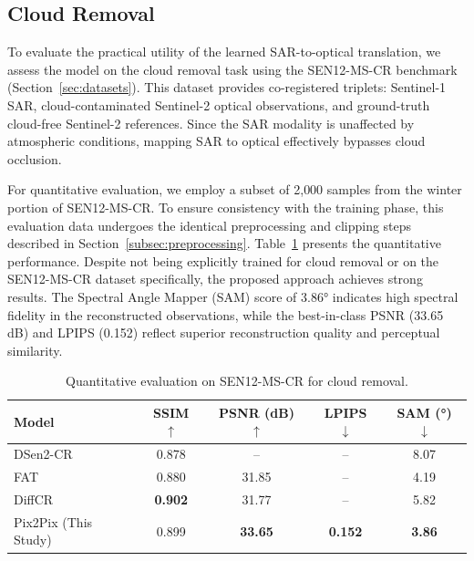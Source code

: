 \documentclass[remotesensing,article,submit,pdftex,moreauthors]{Definitions/mdpi}
\begin{document}
\subsection{Cloud Removal}
\label{sec:cloud_removal}
To evaluate the practical utility of the learned SAR-to-optical translation, we assess the model on the cloud removal task using the SEN12-MS-CR benchmark (Section~\ref{sec:datasets}). This dataset provides co-registered triplets: Sentinel-1 SAR, cloud-contaminated Sentinel-2 optical observations, and ground-truth cloud-free Sentinel-2 references. Since the SAR modality is unaffected by atmospheric conditions, mapping SAR to optical effectively bypasses cloud occlusion.

For quantitative evaluation, we employ a subset of 2{,}000 samples from the winter portion of SEN12-MS-CR. To ensure consistency with the training phase, this evaluation data undergoes the identical preprocessing and clipping steps described in Section~\ref{subsec:preprocessing}. Table~\ref{tab:quantitative_result_cr} presents the quantitative performance. Despite not being explicitly trained for cloud removal or on the SEN12-MS-CR dataset specifically, the proposed approach achieves strong results. The Spectral Angle Mapper (SAM) score of 3.86° indicates high spectral fidelity in the reconstructed observations, while the best-in-class PSNR (33.65 dB) and LPIPS (0.152) reflect superior reconstruction quality and perceptual similarity.

\begin{table}[!htbp]
    \centering
    \caption[Quantitative results on cloud removal against SOTA models]{Quantitative evaluation on SEN12-MS-CR for cloud removal.}
    \begin{tabular}{lcccc}
        \toprule
        \textbf{Model}                & \textbf{SSIM $\uparrow$} & \textbf{PSNR (dB) $\uparrow$} & \textbf{LPIPS $\downarrow$} & \textbf{SAM (°) $\downarrow$} \\
        \midrule
        DSen2-CR~\cite{CR_SEN2_dRNN}  & 0.878                    & --                            & --                          & 8.07                          \\
        FAT~\cite{c_guided_fus_s2ot}  & 0.880                    & 31.85                         & --                          & 4.19                          \\
        DiffCR~\cite{DiffCR}          & \textbf{0.902}           & 31.77                         & --                          & 5.82                          \\
        Pix2Pix (This Study)         & 0.899                    & \textbf{33.65}                & \textbf{0.152}              & \textbf{3.86}                 \\
        \bottomrule
    \end{tabular}
    \label{tab:quantitative_result_cr}
\end{table}
\end{document}
